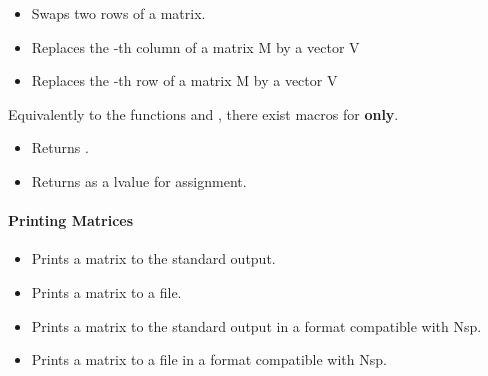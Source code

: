\begin{itemize}
\item {}
  \sshortdescribe Swaps two rows of a matrix.  

\item {}
  \sshortdescribe Replaces the -th column of a matrix M by a vector V 

\item {}
  \sshortdescribe Replaces the -th row of a matrix M by a vector V  
\end{itemize}

Equivalently to the functions  and ,
there exist macros for {\bf {} only}.
\begin{itemize}
\item {}
  \sshortdescribe Returns .
  
\item {}
  \sshortdescribe Returns  as a lvalue for assignment.
\end{itemize}


\paragraph{Printing Matrices}

\begin{itemize}
\item {}
  \sshortdescribe Prints a matrix to the standard output.  

\item {}
  \sshortdescribe Prints a matrix to a file.

\item {}
  \sshortdescribe Prints a matrix to the standard output in a format
  compatible with Nsp.  

\item {}
  \sshortdescribe Prints a matrix to a file in a format compatible with Nsp.
\end{itemize}

